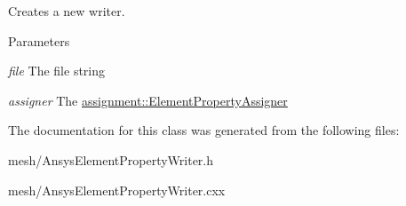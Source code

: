 Creates a new writer. 


\begin{DoxyParams}{Parameters}
\item[{\em file}]The file string \item[{\em assigner}]The \hyperlink{classassignment_1_1_element_property_assigner}{assignment::ElementPropertyAssigner} \end{DoxyParams}


The documentation for this class was generated from the following files:\begin{DoxyCompactItemize}
\item 
mesh/AnsysElementPropertyWriter.h\item 
mesh/AnsysElementPropertyWriter.cxx\end{DoxyCompactItemize}
